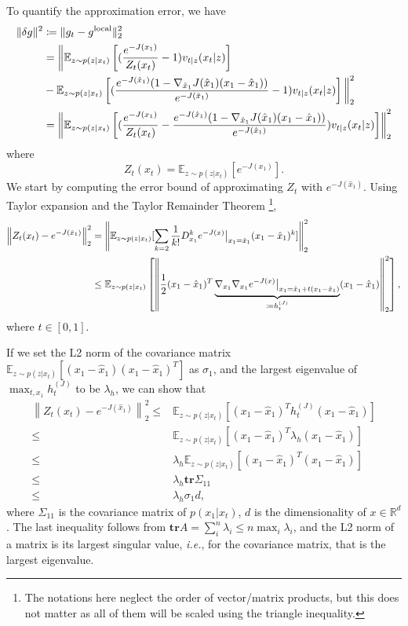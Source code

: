 To quantify the approximation error, we have
\begin{align}
    \nonumber \|\delta g\|^2&\coloneqq \|g_t - g^{\text{local}}\|^2_2 \\
    \nonumber&=\bigg{\|}\mathbb{E}_{z \sim p(z|x_t)} 
    \left[
    (\frac{e^{-J(x_1)}}{Z_t(x_t)} - 1)v_{t|z}(x_t|z)
    \right] \\
    \nonumber&- \mathbb{E}_{z \sim p(z|x_t)} 
    \left[
    (\frac{e^{-J(\hat{x}_1)}(1 - \nabla_{\hat{x}_1} J(\hat{x}_1) (x_1 - \hat{x}_1))}{e^{-J(\hat{x}_1)}} - 1)v_{t|z}(x_t|z)
    \right] \bigg{\|}_2^2\\
    &=\left\|\mathbb{E}_{z \sim p(z|x_t)} 
    \left[
    (\frac{e^{-J(x_1)}}{Z_t(x_t)}-\frac{e^{-J(\hat{x}_1)}(1 - \nabla_{\hat{x}_1} J(\hat{x}_1) (x_1 - \hat{x}_1))}{e^{-J(\hat{x}_1)}})v_{t|z}(x_t|z)
    \right] \right\|_2^2
\end{align}
where 
\begin{equation}
    Z_t(x_t) = \mathbb{E}_{z\sim p(z|x_t)} [e^{-J(x_1)}].
\end{equation}
We start by computing the error bound of approximating $Z_t$ with $e^{-J(\hat{x}_1)}$. Using Taylor expansion and the Taylor Remainder Theorem \footnote{The notations here neglect the order of vector/matrix products, but this does not matter as all of them will be scaled using the triangle inequality.}, 
\begin{align}\nonumber
    \left\|Z_t(x_t)-e^{-J(\hat{x}_1)}\right\|^2_2 &= \left\|\mathbb{E}_{z\sim p(z|x_t)}[\sum_{k=2} \frac{1}{k!}D_{x_1}^k e^{-J(x)}\big{|}_{x_1=\hat{x}_1} (x_1 - \hat{x}_1)^k] \right\|_2^2 \\
    &\le \mathbb{E}_{z\sim p(z|x_t)}
    \left
    [\left\|\frac{1}{2} (x_1 - \hat{x}_1)^T \underbrace{\nabla_{x_1} \nabla_{x_1} e^{-J(x)}\big{|}_{x_1=\hat{x}_1 + t (x_1 - \hat{x}_1)}}_{\coloneqq h^{(J)}_t} (x_1 - \hat{x}_1)
    \right\|_2^2
    \right] ,
\end{align}
where $t\in[0, 1]$.


If we set the L2 norm of the covariance matrix $\mathbb{E}_{z\sim p(z|x_t)}[ (x_1 - \hat{x}_1)(x_1 - \hat{x}_1)^T]$ as $\sigma_1$, and the largest eigenvalue of $\max_{t,x_1}h^{(J)}_t$ to be $\lambda_{h}$, we can show that  
\begin{align}
    \nonumber \left\|Z_t(x_t)-e^{-J(\hat{x}_1)}\right\|^2_2 \le &\mathbb{E}_{z\sim p(z|x_t)}[(x_1 - \hat{x}_1)^T h^{(J)}_t(x_1 - \hat{x}_1)]\\
    \nonumber \le &\mathbb{E}_{z\sim p(z|x_t)}[(x_1 - \hat{x}_1)^T \lambda_h(x_1 - \hat{x}_1)]\\
    \nonumber \le &\lambda_h\mathbb{E}_{z\sim p(z|x_t)}[ (x_1 - \hat{x}_1)^T(x_1 - \hat{x}_1)]\\
    \nonumber \le& \lambda_h \mathbf{tr}\Sigma_{11} \\
    \le&\lambda_h \sigma_1 d,
\end{align}
where $\Sigma_{11}$ is the covariance matrix of $p(x_1|x_t)$, $d$ is the dimensionality of $x \in \mathbb{R}^d$. The last inequality follows from $\mathbf{tr}A = \sum_i^n \lambda_i \le n \max_i\lambda_i $, and the L2 norm of a matrix is its largest singular value, \emph{i.e.}, for the covariance matrix, that is the largest eigenvalue.

